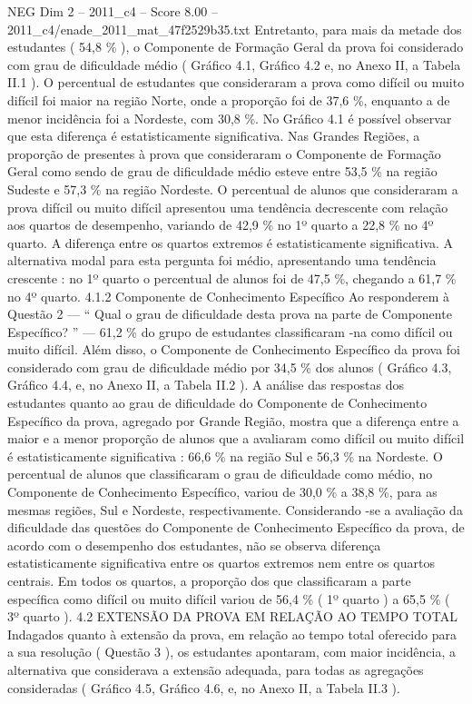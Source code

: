 \begin{textsample}{NEG Dim 2 – 2011\_c4 – Score 8.00 – 2011\_c4/enade\_2011\_mat\_47f2529b35.txt}
Entretanto, para mais da metade dos estudantes ( 54,8 \% ), o Componente de Formação Geral da prova foi considerado com grau de dificuldade médio ( Gráfico 4.1, Gráfico 4.2 e, no Anexo II, a Tabela II.1 ).
O percentual de estudantes que consideraram a prova como difícil ou muito difícil foi maior na região Norte, onde a proporção foi de 37,6 \%, enquanto a de menor incidência foi a Nordeste, com 30,8 \%.
No Gráfico 4.1 é possível observar que esta diferença é estatisticamente significativa.
Nas Grandes Regiões, a proporção de presentes à prova que consideraram o Componente de Formação Geral como sendo de grau de dificuldade médio esteve entre 53,5 \% na região Sudeste e 57,3 \% na região Nordeste.
O percentual de alunos que consideraram a prova difícil ou muito difícil apresentou uma tendência decrescente com relação aos quartos de desempenho, variando de 42,9 \% no 1º quarto a 22,8 \% no 4º quarto.
A diferença entre os quartos extremos é estatisticamente significativa.
A alternativa modal para esta pergunta foi médio, apresentando uma tendência crescente : no 1º quarto o percentual de alunos foi de 47,5 \%, chegando a 61,7 \% no 4º quarto. 4.1.2 Componente de Conhecimento Específico Ao responderem à Questão 2 — “ Qual o grau de dificuldade desta prova na parte de Componente Específico? ” — 61,2 \% do grupo de estudantes classificaram -na como difícil ou muito difícil.
Além disso, o Componente de Conhecimento Específico da prova foi considerado com grau de dificuldade médio por 34,5 \% dos alunos ( Gráfico 4.3, Gráfico 4.4, e, no Anexo II, a Tabela II.2 ).
A análise das respostas dos estudantes quanto ao grau de dificuldade do Componente de Conhecimento Específico da prova, agregado por Grande Região, mostra que a diferença entre a maior e a menor proporção de alunos que a avaliaram como difícil ou muito difícil é estatisticamente significativa : 66,6 \% na região Sul e 56,3 \% na Nordeste.
O percentual de alunos que classificaram o grau de dificuldade como médio, no Componente de Conhecimento Específico, variou de 30,0 \% a 38,8 \%, para as mesmas regiões, Sul e Nordeste, respectivamente.
Considerando -se a avaliação da dificuldade das questões do Componente de Conhecimento Específico da prova, de acordo com o desempenho dos estudantes, não se observa diferença estatisticamente significativa entre os quartos extremos nem entre os quartos centrais.
Em todos os quartos, a proporção dos que classificaram a parte específica como difícil ou muito difícil variou de 56,4 \% ( 1º quarto ) a 65,5 \% ( 3º quarto ). 4.2 EXTENSÃO DA PROVA EM RELAÇÃO AO TEMPO TOTAL Indagados quanto à extensão da prova, em relação ao tempo total oferecido para a sua resolução ( Questão 3 ), os estudantes apontaram, com maior incidência, a alternativa que considerava a extensão adequada, para todas as agregações consideradas ( Gráfico 4.5, Gráfico 4.6, e, no Anexo II, a Tabela II.3 ).

\end{textsample}
